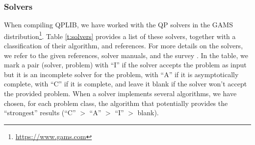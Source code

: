 \subsubsection{Solvers}\label{subsec:solver}

When compiling QPLIB, we have worked with the QP solvers in the GAMS distribution\footnote{\url{https://www.gams.com}}.
Table \ref{t:solvers} provides a list of these solvers, together with a classification of their algorithm, and references.
For more details on the solvers, we refer to the given references, solver manuals, and the survey \cite{BuVi10}.
In the table, we mark a pair (solver, problem) with ``I'' if the solver accepts the problem as input but it is an incomplete solver for the problem, with ``A'' if it is asymptotically complete, with ``C'' if it is complete, and leave it blank if the solver won't accept the provided problem.
When a solver implements several algorithms, we have chosen, for each problem class, the algorithm that potentially provides the ``strongest'' results (``C'' $>$ ``A'' $>$ ``I'' $>$ blank).


